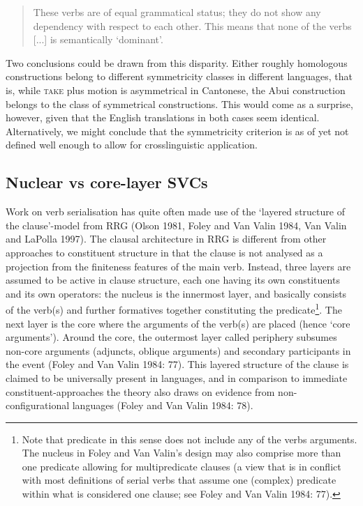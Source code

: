\begin{quote}These verbs are of equal grammatical status; they do not show any dependency with respect to each other. This means that none of the verbs [...] is semantically `dominant'.\end{quote}

Two conclusions could be drawn from this disparity. Either roughly homologous constructions belong to different symmetricity classes in different languages, that is, while \textsc{take} plus motion is asymmetrical in Cantonese, the Abui construction belongs to the class of symmetrical constructions. This would come as a surprise, however, given that the English translations in both cases seem identical. Alternatively, we might conclude that the symmetricity criterion is as of yet not defined well enough to allow for crosslinguistic application. 

\subsection{Nuclear vs core-layer SVCs}\label{sec:nuclear}

Work on verb serialisation has quite often made use of the `layered structure of the clause'-model from RRG (Olson 1981, Foley and Van Valin 1984, Van Valin and LaPolla 1997). The clausal architecture in RRG is different from other approaches to constituent structure in that the clause is not analysed as a projection from the finiteness features of the main verb. Instead, three layers are assumed to be active in clause structure, each one having its own constituents and its own operators: the nucleus is the innermost layer, and basically consists of the verb(s) and further formatives together constituting the predicate\footnote{Note that predicate in this sense does not include any of the verbs arguments. The nucleus in Foley and Van Valin's design may also comprise more than one predicate allowing for multipredicate clauses (a view that is in conflict with most definitions of serial verbs that assume one (complex) predicate within what is considered one clause; see Foley and Van Valin 1984: 77).}. The next layer is the core where the arguments of the verb(s) are placed (hence `core arguments'). Around the core, the outermost layer called periphery subsumes non-core arguments (adjuncts, oblique arguments) and secondary participants in the event (Foley and Van Valin 1984: 77). This layered structure of the clause is claimed to be universally present in languages, and in comparison to immediate constituent-approaches the theory also draws on evidence from non-configurational languages (Foley and Van Valin 1984: 78).

